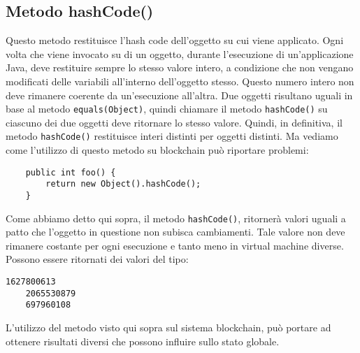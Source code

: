 		\subsection{Metodo hashCode()}
		\label{object-hashcode}
			Questo metodo restituisce l'hash code dell'oggetto su cui viene applicato. Ogni volta che viene invocato su di un oggetto, durante l'esecuzione di un'applicazione Java, deve restituire sempre lo stesso valore intero, a condizione che non vengano modificati delle variabili all'interno dell'oggetto stesso. Questo numero intero non deve rimanere coerente da un'esecuzione all'altra. Due oggetti risultano uguali in base al metodo \lstinline|equals(Object)|, quindi chiamare il metodo \lstinline|hashCode()| su ciascuno dei due oggetti deve ritornare lo stesso valore. Quindi, in definitiva, il metodo \lstinline|hashCode()| restituisce interi distinti per oggetti distinti. Ma vediamo come l'utilizzo di questo metodo su blockchain può riportare problemi:
			\begin{lstlisting}
	public int foo() {
		return new Object().hashCode();
	}
			\end{lstlisting}
			Come abbiamo detto qui sopra, il metodo \lstinline|hashCode()|, ritornerà valori uguali a patto che l'oggetto in questione non subisca cambiamenti. Tale valore non deve rimanere costante per ogni esecuzione e tanto meno in virtual machine diverse. Possono essere ritornati dei valori del tipo:
			\begin{lstlisting}[numbers=none,frame=none]
	1627800613
	2065530879
	697960108
			\end{lstlisting}
			L'utilizzo del metodo visto qui sopra sul sistema blockchain, può portare ad ottenere risultati diversi che possono influire sullo stato globale.
			
